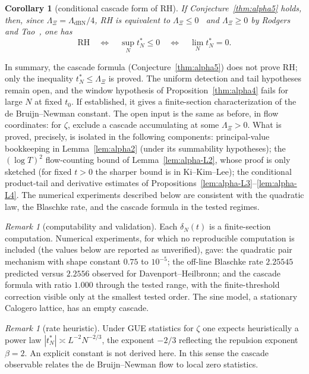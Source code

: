 \documentclass[11pt]{amsart}
\newtheorem{corollary}[theorem]{Corollary}
\theoremstyle{definition}
\theoremstyle{remark}
\newtheorem{remark}[theorem]{Remark}
\theoremstyle{definition}
\begin{document}
\begin{corollary}[conditional cascade form of RH]\label{cor:alpha-rh}
If Conjecture~\ref{thm:alpha5} holds, then, since $\Lambda_\Xi=\Lambda_{\mathrm{dBN}}/4$, RH is equivalent to
$\Lambda_\Xi\le0$~\cite{deBruijn,Newman} and $\Lambda_\Xi\ge0$ by Rodgers and
Tao~\cite{RodgersTao}, one has
\[
   \mathrm{RH}\quad\Longleftrightarrow\quad \sup_N t_N^*\le0
   \quad\Longleftrightarrow\quad
   \lim_N t_N^*=0 .
\]
\end{corollary}

In summary, the cascade formula (Conjecture~\ref{thm:alpha5}) does not prove RH; only the inequality
$t_N^*\le\Lambda_\Xi$ is proved.  The uniform detection and tail hypotheses remain open, and the
window hypothesis of Proposition~\ref{thm:alpha4} fails for large $N$ at fixed $t_0$.  If established, it gives a finite-section
characterization of the de Bruijn--Newman constant.  The open input is the same as before, in flow
coordinates: for $\zeta$, exclude a cascade accumulating at some $\Lambda_\Xi>0$. What is proved,
precisely, is isolated in the following components: principal-value bookkeeping in Lemma~\ref{lem:alpha2}
(under its summability hypotheses); the $(\log T)^2$ flow-counting bound of Lemma~\ref{lem:alpha-L2}, whose proof is only sketched (for
fixed $t>0$ the sharper bound is in Ki--Kim--Lee);
the conditional product-tail and derivative estimates of
Propositions~\ref{lem:alpha-L3}--\ref{lem:alpha-L4}.  The numerical experiments described below are
consistent with the quadratic law, the Blaschke rate, and the cascade formula in the tested regimes.

\begin{remark}[computability and validation]\label{rmk:cascade-validation}
Each $\delta_N(t)$ is a finite-section computation.  Numerical experiments, for which no reproducible
computation is included (the values below are reported as unverified), gave: the quadratic
pair mechanism with shape constant $0.75$ to $10^{-5}$; the off-line Blaschke rate $2.25545$
predicted versus $2.2556$ observed for Davenport--Heilbronn; and the cascade formula with ratio
$1.000$ through the tested range, with the finite-threshold correction visible only at the smallest
tested order.  The sine model, a stationary Calogero lattice, has an empty cascade.
\end{remark}

\begin{remark}[rate heuristic]\label{rmk:cascade-rate}
Under GUE statistics for $\zeta$ one expects heuristically a power law $|t_N^*|\asymp L^{-2}N^{-2/3}$,
the exponent $-2/3$ reflecting the repulsion exponent $\beta=2$.  An explicit constant is not derived
here.  In this sense the cascade observable relates the de Bruijn--Newman flow to local zero
statistics.
\end{remark}
\end{document}
